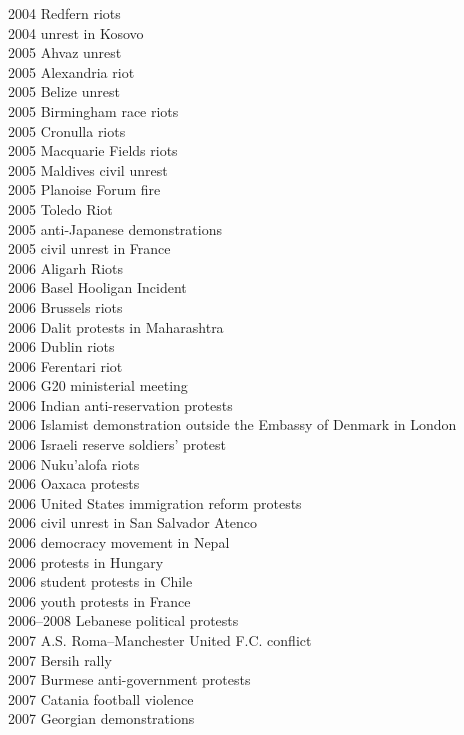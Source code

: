 2004 Redfern riots\\
2004 unrest in Kosovo\\
2005 Ahvaz unrest\\
2005 Alexandria riot\\
2005 Belize unrest\\
2005 Birmingham race riots\\
2005 Cronulla riots\\
2005 Macquarie Fields riots\\
2005 Maldives civil unrest\\
2005 Planoise Forum fire\\
2005 Toledo Riot\\
2005 anti-Japanese demonstrations\\
2005 civil unrest in France\\
2006 Aligarh Riots\\
2006 Basel Hooligan Incident\\
2006 Brussels riots\\
2006 Dalit protests in Maharashtra\\
2006 Dublin riots\\
2006 Ferentari riot\\
2006 G20 ministerial meeting\\
2006 Indian anti-reservation protests\\
2006 Islamist demonstration outside the Embassy of Denmark in London\\
2006 Israeli reserve soldiers' protest\\
2006 Nuku'alofa riots\\
2006 Oaxaca protests\\
2006 United States immigration reform protests\\
2006 civil unrest in San Salvador Atenco\\
2006 democracy movement in Nepal\\
2006 protests in Hungary\\
2006 student protests in Chile\\
2006 youth protests in France\\
2006–2008 Lebanese political protests\\
2007 A.S. Roma–Manchester United F.C. conflict\\
2007 Bersih rally\\
2007 Burmese anti-government protests\\
2007 Catania football violence\\
2007 Georgian demonstrations\\
